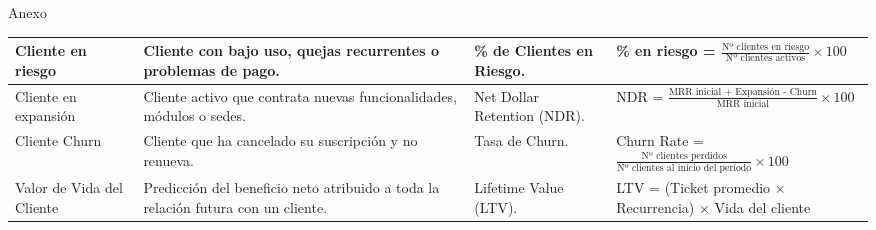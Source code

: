 \begin{appendixd}{Anexo}
\begin{table}[H]
\begin{threeparttable}
\begin{tabular}{|l|C{3.5cm}|C{3.3cm}|C{5.5cm}|}
      \hline
      Cliente en riesgo & Cliente con bajo uso, quejas recurrentes o problemas de pago. &
      \% de Clientes en Riesgo. &
      \% en riesgo = $\tfrac{\text{Nº clientes en riesgo}}{\text{Nº clientes activos}} \times 100$ \\
      \hline
      Cliente en expansión & Cliente activo que contrata nuevas funcionalidades, módulos o sedes. &
      Net Dollar Retention (NDR). &
      NDR = $\tfrac{\text{MRR inicial + Expansión - Churn}}{\text{MRR inicial}} \times 100$ \\
      \hline
      Cliente Churn & Cliente que ha cancelado su suscripción y no renueva. &
      Tasa de Churn. &
      Churn Rate = $\tfrac{\text{Nº clientes perdidos}}{\text{Nº clientes al inicio del período}} \times 100$ \\
      \hline
      Valor de Vida del Cliente & Predicción del beneficio neto atribuido a toda la relación futura con un cliente. &
      Lifetime Value (LTV). &
      LTV = (Ticket promedio $\times$ Recurrencia) $\times$ Vida del cliente \\
      \hline
    \end{tabular}
    \label{tab:estados-cliente}
  \end{threeparttable}
\end{table}



\end{appendixd}

